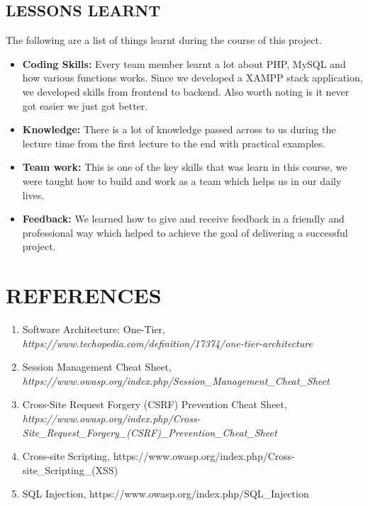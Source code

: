 \documentclass[12pt,a4paper]{article}
\begin{document}
	
	\subsection{LESSONS LEARNT}
	\begin{flushleft}
		The following are a list of things learnt during the course of this project.
		\begin{itemize}
		\item \textbf{Coding Skills:} Every team member learnt a lot about PHP, MySQL and how various functions works. Since we developed a XAMPP stack application, we developed skills from frontend to backend. Also worth noting is it never got easier we just got better.
		\item \textbf{Knowledge:} There is a lot of knowledge passed across to us during the lecture time from the first lecture to the end with practical examples.
		\item \textbf{Team work:} This is one of the key skills that was learn in this course, we were taught how to build and work as a
		team which helps us in our daily lives.
		\item \textbf{Feedback:} We learned how to give and receive feedback in a friendly and professional way which helped to achieve the goal of delivering a successful project.
		\end{itemize}
	\end{flushleft}
	
	\section{REFERENCES}
	
	\begin{enumerate}
		\item Software Architecture: One-Tier, \textit{https://www.techopedia.com/definition/17374/one-tier-architecture}
		\item Session Management Cheat Sheet, \textit{https://www.owasp.org/index.php/Session\_Management\_Cheat\_Sheet}
		\item Cross-Site Request Forgery (CSRF) Prevention Cheat Sheet, \textit{https://www.owasp.org/index.php/Cross-Site\_Request\_Forgery\_(CSRF)\_Prevention\_Cheat\_Sheet}
		\item Cross-site Scripting, https://www.owasp.org/index.php/Cross-site\_Scripting\_(XSS)
		\item SQL Injection, https://www.owasp.org/index.php/SQL\_Injection
	\end{enumerate}
	
		
	
\end{document}
